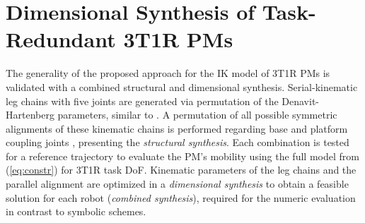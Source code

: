 \documentclass[
	graybox,
	vecphys] %
	{svmult}
\newcommand{\bm}[1]{\boldsymbol{#1}}
\newcommand{\Res}[0]{\vec{\delta}}
\begin{document}
%
%
%
%
%
%
%



\section{Dimensional Synthesis of Task-Redundant 3T1R PMs}
\label{sec:synthesis}

The generality of the proposed approach for the IK model of 3T1R PMs is validated with a combined structural and dimensional synthesis.
Serial-kinematic leg chains with five joints are generated via permutation of the Denavit-Hartenberg parameters, similar to \cite{Gogu2008}. %
A permutation of all possible symmetric alignments of these kinematic chains is performed regarding base and platform coupling joints \cite{Gogu2008,KongGos2007,Merlet2006,BriotKha2015}, presenting the \emph{structural synthesis}.
Each combination is tested for a reference trajectory to evaluate the PM's mobility using the full model from (\ref{eq:constr}) for 3T1R task DoF.
Kinematic parameters of the leg chains and the parallel alignment are optimized in a \emph{dimensional synthesis} to obtain a feasible solution for each robot (\emph{combined synthesis}), required for the numeric evaluation in contrast to symbolic schemes.
\end{document}
